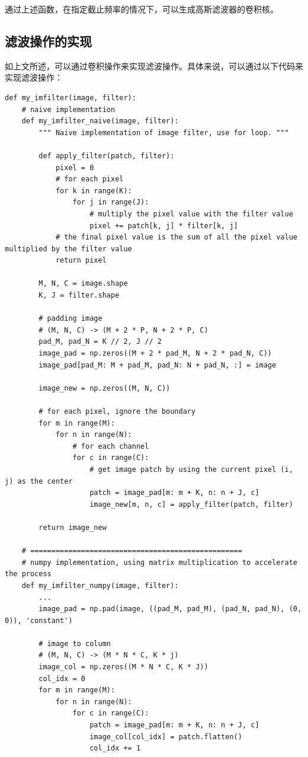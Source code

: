 \documentclass{article}
\begin{document}
通过上述函数，在指定截止频率的情况下，可以生成高斯滤波器的卷积核。

\subsection{滤波操作的实现}

如上文所述，可以通过卷积操作来实现滤波操作。具体来说，可以通过以下代码来实现滤波操作：

\begin{lstlisting}[style=Python]
def my_imfilter(image, filter):
    # naive implementation
    def my_imfilter_naive(image, filter):
        """ Naive implementation of image filter, use for loop. """
        
        def apply_filter(patch, filter):
            pixel = 0
            # for each pixel
            for k in range(K):
                for j in range(J):
                    # multiply the pixel value with the filter value
                    pixel += patch[k, j] * filter[k, j]
            # the final pixel value is the sum of all the pixel value multiplied by the filter value
            return pixel
        
        M, N, C = image.shape
        K, J = filter.shape

        # padding image
        # (M, N, C) -> (M + 2 * P, N + 2 * P, C)
        pad_M, pad_N = K // 2, J // 2
        image_pad = np.zeros((M + 2 * pad_M, N + 2 * pad_N, C))
        image_pad[pad_M: M + pad_M, pad_N: N + pad_N, :] = image

        image_new = np.zeros((M, N, C))
        
        # for each pixel, ignore the boundary
        for m in range(M):
            for n in range(N):
                # for each channel
                for c in range(C):
                    # get image patch by using the current pixel (i, j) as the center
                    patch = image_pad[m: m + K, n: n + J, c]
                    image_new[m, n, c] = apply_filter(patch, filter)
        
        return image_new
    
    # ==================================================
    # numpy implementation, using matrix multiplication to accelerate the process
    def my_imfilter_numpy(image, filter):
        ...
        image_pad = np.pad(image, ((pad_M, pad_M), (pad_N, pad_N), (0, 0)), 'constant')

        # image to column
        # (M, N, C) -> (M * N * C, K * j)
        image_col = np.zeros((M * N * C, K * J))
        col_idx = 0
        for m in range(M):
            for n in range(N):
                for c in range(C):
                    patch = image_pad[m: m + K, n: n + J, c]
                    image_col[col_idx] = patch.flatten()
                    col_idx += 1
        

\end{lstlisting}
\end{document}
